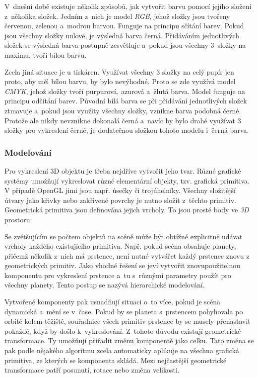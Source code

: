 \documentclass[a4paper,12pt]{article}
\begin{document}
V~dnešní době existuje několik způsobů, jak vytvořit barvu pomocí jejího složení z~několika složek. Jedním z~nich je model \textit{RGB}, jehož složky jsou tvořeny červenou, zelenou a~modrou barvou. Funguje na principu sčítání barev. Pokud jsou všechny složky nulové, je výsledná barva černá. Přidáváním jednotlivých složek se výsledná barva postupně zesvětluje a~pokud jsou všechny 3~složky na maximu, tvoří bílou barvu.~\cite{graphic}

Zcela jiná situace je u tiskáren. Využívat všechny 3 složky na celý papír jen proto, aby měl bílou barvu, by bylo nevýhodné. Proto se zde využívá model \textit{CMYK}, jehož složky tvoří purpurová, azurová a~žlutá barva. Model funguje na principu odčítání barev. Původní bílá barva se při přidávání jednotlivých složek ztmavuje a~pokud jsou využity všechny složky, vznikne barva podobná černé. Protože ale nikdy nevznikne dokonalá černá a~navíc by bylo drahé využívat 3 složky pro vykreslení černé, je dodatečnou složkou tohoto modelu i~černá barva.~\cite{graphic}

\subsubsection{Modelování}

Pro vykreslení 3D objektu je třeba nejdříve vytvořit jeho tvar. Různé grafické systémy umožňují vykreslovat různé elementární objekty, tzv. grafická primitiva. V případě OpenGL jimi jsou např. úsečky či trojúhelníky. Všechny složitější útvary jako křivky nebo zakřivené povrchy je nutno složit z~těchto primitiv. Geometrická primitiva jsou definována jejich vrcholy. To jsou prosté body ve \textit{3D} prostoru.~\cite{graphic}

Se zvětšujícím se počtem objektů na scéně může být obtížné explicitně udávat vrcholy každého existujícího primitiva. Např. pokud scéna obsahuje planety, přičemž několik z~nich má prstence, není nutné vytvářet každý prstenec znovu z geometrických primitiv. Jako vhodné řešení se jeví vytvořit znovupoužitelnou komponentu pro vykreslení prstence a~tu s~různými parametry použít pro všechny planety. Tento postup se nazývá hierarchické modelování.~\cite{graphic}

Vytvořené komponenty pak usnadňují situaci o~to více, pokud je scéna dynamická a~mění se v~čase. Pokud by se planeta s~prstencem pohyhovala po orbitě kolem těžiště, souřadnice všech primitiv prstence by se musely přenastavit pokaždé, když by došlo k~vykreslování. Z~tohoto důvodu existují geometrické transformace. Ty umožňují přiřadit změnu komponentě jako celku. Tato změna se pak podle nějakého algoritmu zcela automaticky aplikuje na všechna grafická primitiva, ze kterých se komponenta skládá. Mezi nejčastější geometrické transformace patří posunutí, rotace nebo změna velikosti.~\cite{graphic}
\end{document}

